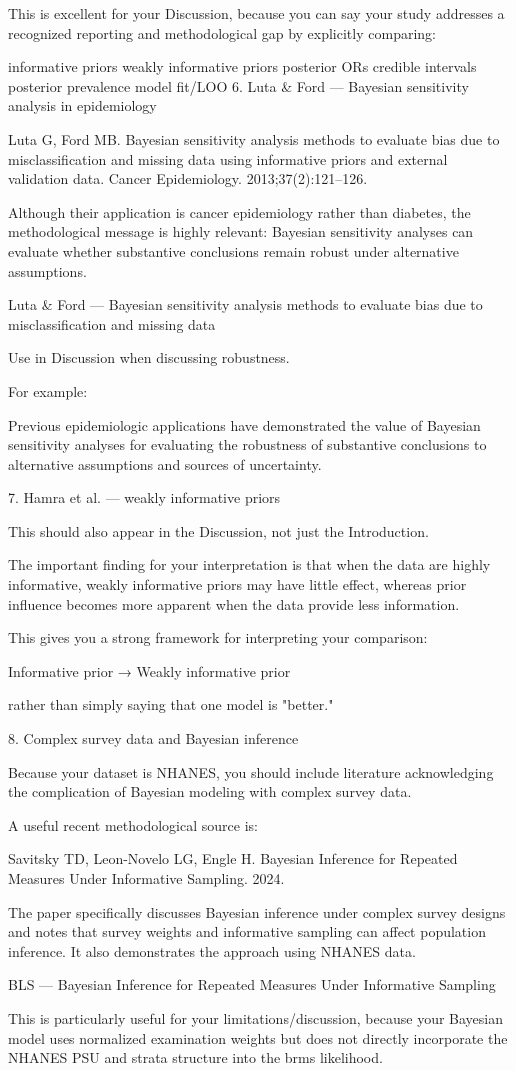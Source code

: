 This is excellent for your Discussion, because you can say your study addresses a recognized reporting and methodological gap by explicitly comparing:

informative priors
weakly informative priors
posterior ORs
credible intervals
posterior prevalence
model fit/LOO
6. Luta & Ford — Bayesian sensitivity analysis in epidemiology

Luta G, Ford MB. Bayesian sensitivity analysis methods to evaluate bias due to misclassification and missing data using informative priors and external validation data. Cancer Epidemiology. 2013;37(2):121–126.

Although their application is cancer epidemiology rather than diabetes, the methodological message is highly relevant: Bayesian sensitivity analyses can evaluate whether substantive conclusions remain robust under alternative assumptions.

Luta & Ford — Bayesian sensitivity analysis methods to evaluate bias due to misclassification and missing data

Use in Discussion when discussing robustness.

For example:

Previous epidemiologic applications have demonstrated the value of Bayesian sensitivity analyses for evaluating the robustness of substantive conclusions to alternative assumptions and sources of uncertainty.

7. Hamra et al. — weakly informative priors

This should also appear in the Discussion, not just the Introduction.

The important finding for your interpretation is that when the data are highly informative, weakly informative priors may have little effect, whereas prior influence becomes more apparent when the data provide less information.

This gives you a strong framework for interpreting your comparison:

Informative prior → Weakly informative prior

rather than simply saying that one model is "better."

8. Complex survey data and Bayesian inference

Because your dataset is NHANES, you should include literature acknowledging the complication of Bayesian modeling with complex survey data.

A useful recent methodological source is:

Savitsky TD, Leon-Novelo LG, Engle H. Bayesian Inference for Repeated Measures Under Informative Sampling. 2024.

The paper specifically discusses Bayesian inference under complex survey designs and notes that survey weights and informative sampling can affect population inference. It also demonstrates the approach using NHANES data.

BLS — Bayesian Inference for Repeated Measures Under Informative Sampling

This is particularly useful for your limitations/discussion, because your Bayesian model uses normalized examination weights but does not directly incorporate the NHANES PSU and strata structure into the brms likelihood.